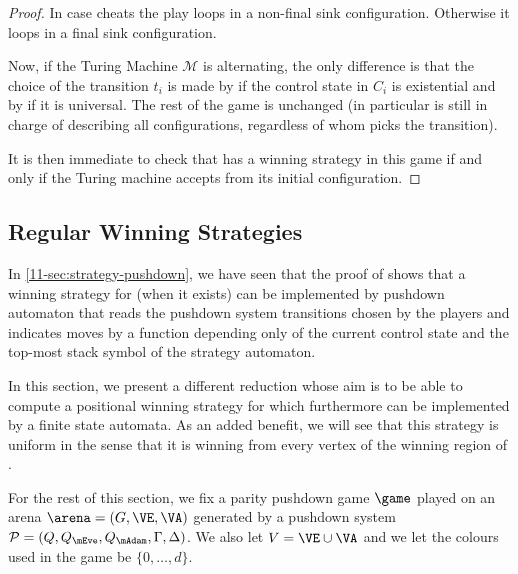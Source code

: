 \begin{proof}
In case \Eve cheats the play loops in a non-final sink configuration. Otherwise it loops in a final sink configuration.

Now, if the Turing Machine $\mathcal{M}$ is alternating, the only difference is that the choice of the transition $t_i$ is made by \Eve if the control state in $C_i$ is existential and by \Adam if it is universal. The rest of the game is unchanged (in particular \Eve is still in charge of describing all configurations, regardless of whom picks the transition).

It is then immediate to check that \Eve has a winning strategy in this game if and only if the Turing machine accepts from its initial configuration.	
\end{proof}




\subsection{Regular Winning Strategies}\label{11-section:regular-strat}


In \ref{11-sec:strategy-pushdown}, we have seen that the proof of  shows that a winning strategy for \Eve (when it exists) can be implemented by pushdown automaton that reads the pushdown system transitions chosen by the players and indicates \Eve moves by a function depending only of the current control state and the top-most stack symbol of the strategy automaton. 

In this section, we present a different reduction whose aim is to be able to compute a positional winning strategy for \Eve which furthermore can be implemented by a finite state automata. As an added benefit, we will see that this strategy is uniform in the sense that it is winning from every vertex of the winning region of \Eve.

For the rest of this section, we fix a parity pushdown game $\game$ played on an arena $\arena = (G,\VE,\VA)$ generated by a pushdown system $\PDS = (Q,Q_{\mEve}, Q_{\mAdam}, \Gamma,\Delta)$. We also let $V=\VE\cup\VA$ and we let the colours used in the game be $\{0,\dots,d\}$.


